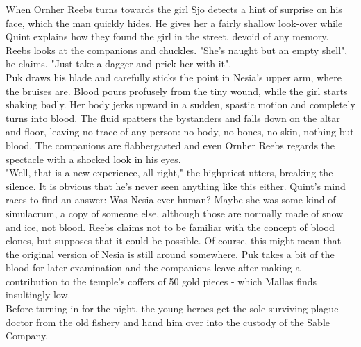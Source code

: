 When Ornher Reebs turns towards the girl Sjo detects a hint of surprise on his face, which the man quickly hides. He gives her a fairly shallow look-over while Quint explains how they found the girl in the street, devoid of any memory. Reebs looks at the companions and chuckles. "She's naught but an empty shell", he claims. "Just take a dagger and prick her with it".\\

Puk draws his blade and carefully sticks the point in Nesia's upper arm, where the bruises are. Blood pours profusely from the tiny wound, while the girl starts shaking badly. Her body jerks upward in a sudden, spastic motion and completely turns into blood. The fluid spatters the bystanders and falls down on the altar and floor, leaving no trace of any person: no body, no bones, no skin, nothing but blood. The companions are flabbergasted and even Ornher Reebs regards the spectacle with a shocked look in his eyes.\\

"Well, that is a new experience, all right," the highpriest utters, breaking the silence. It is obvious that he's never seen anything like this either. Quint's mind races to find an answer: Was Nesia ever human? Maybe she was some kind of simulacrum, a copy of someone else, although those are normally made of snow and ice, not blood. Reebs claims not to be familiar with the concept of blood clones, but supposes that it could be possible. Of course, this might mean that the original version of Nesia is still around somewhere. Puk takes a bit of the blood for later examination and the companions leave after making a contribution to the temple's coffers of 50 gold pieces - which Mallas finds insultingly low.\\

Before turning in for the night, the young heroes get the sole surviving plague doctor from the old fishery and hand him over into the custody of the Sable Company.\\


